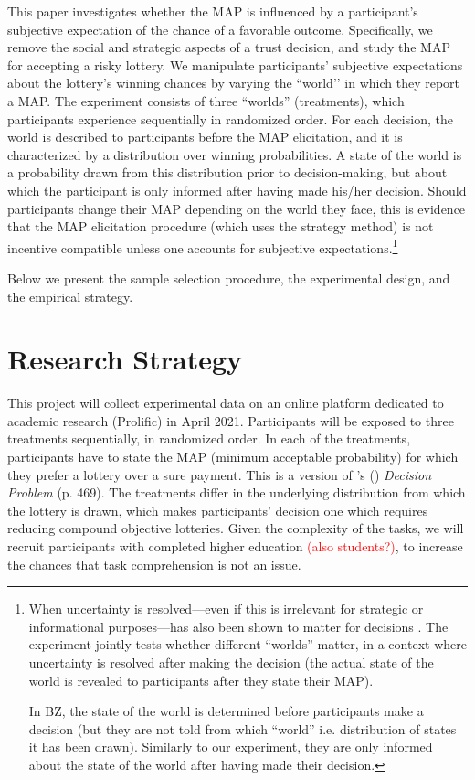This paper investigates whether the MAP is influenced by a participant’s subjective expectation of the chance of a favorable outcome. 
Specifically, we remove the social and strategic aspects of a trust decision, and study the MAP for accepting a risky lottery.
We manipulate participants’ subjective expectations about the lottery’s winning chances by varying the ``world’’ in which they report a MAP.
The experiment consists of three ``worlds'' (treatments), which participants experience sequentially in randomized order.
For each decision, the world is described to participants before the MAP elicitation, and it is characterized by a distribution over winning probabilities.
A state of the world is a probability drawn from this distribution prior to decision-making, but about which the participant is only informed after having made his/her decision.
Should participants change their MAP depending on the world they face, this is evidence that the MAP elicitation procedure (which uses the strategy method) is not incentive compatible unless one accounts for subjective expectations.\footnote{
When uncertainty is resolved—even if this is irrelevant for strategic or informational purposes—has also been shown to matter for decisions \citep[see footnote 11 on p. 29 in][]{Johnson2019}.
The experiment jointly tests whether different ``worlds'' matter, in a context where uncertainty is resolved after making the decision (the actual state of the world is revealed to participants after they state their MAP).

In BZ, the state of the world is determined before participants make a decision (but they are not told from which ``world'' i.e. distribution of states it has been drawn).
Similarly to our experiment, they are only informed about the state of the world after having made their decision.
}

Below we present the sample selection procedure, the experimental design, and the empirical strategy.



\section{Research Strategy}
This project will collect experimental data on an online platform dedicated to academic research (Prolific) in April 2021. Participants will be exposed to three treatments sequentially, in randomized order.
In each of the treatments, participants have to state the MAP (minimum acceptable probability) for which they prefer a lottery over a sure payment.
This is a version of \citeauthor{Bohnet2004}'s (\citeyear{Bohnet2004}) \textit{Decision Problem} (p. 469).
The treatments differ in the underlying distribution from which the lottery is drawn, which makes participants' decision one which requires reducing compound objective lotteries.
Given the complexity of the tasks, we will recruit participants with completed higher education \textcolor{red}{(also students?)}, to increase the chances that task comprehension is not an issue.

